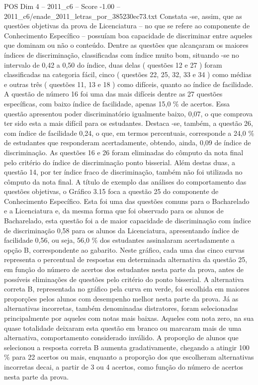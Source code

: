 \begin{textsample}{POS Dim 4 – 2011\_c6 – Score -1.00 – 2011\_c6/enade\_2011\_letras\_por\_385230ec73.txt}
Constata -se, assim, que as questões objetivas da prova de Licenciatura – no que se refere ao componente de Conhecimento Específico – possuíam boa capacidade de discriminar entre aqueles que dominam ou não o conteúdo.
Dentre as questões que alcançaram os maiores índices de discriminação, classificadas com índice muito bom, situando -se no intervalo de 0,42 a 0,50 do índice, duas delas ( questões 12 e 27 ) foram classificadas na categoria fácil, cinco ( questões 22, 25, 32, 33 e 34 ) como médias e outras três ( questões 11, 13 e 18 ) como difíceis, quanto ao índice de facilidade.
A questão de número 16 foi uma das mais difíceis dentre as 27 questões específicas, com baixo índice de facilidade, apenas 15,0 \% de acertos.
Essa questão apresentou poder discriminatório igualmente baixo, 0,07, o que comprova ter sido esta a mais difícil para os estudantes.
Destaca -se, também, a questão 26, com índice de facilidade 0,24, o que, em termos percentuais, corresponde a 24,0 \% de estudantes que responderam acertadamente, obtendo, ainda, 0,09 de índice de discriminação.
As questões 16 e 26 foram eliminadas do cômputo da nota final pelo critério do índice de discriminação ponto bisserial.
Além destas duas, a questão 14, por ter índice fraco de discriminação, também não foi utilizada no cômputo da nota final.
A título de exemplo das análises do comportamento das questões objetivas, o Gráfico 3.15 foca a questão 25 do componente de Conhecimento Específico.
Esta foi uma das questões comuns para o Bacharelado e a Licenciatura e, da mesma forma que foi observado para os alunos de Bacharelado, esta questão foi a de maior capacidade de discriminação com índice de discriminação 0,58 para os alunos da Licenciatura, apresentando índice de facilidade 0,56, ou seja, 56,0 \% dos estudantes assinalaram acertadamente a opção B, correspondente ao gabarito.
Neste gráfico, cada uma das cinco curvas representa o percentual de respostas em determinada alternativa da questão 25, em função do número de acertos dos estudantes nesta parte da prova, antes de possíveis eliminações de questões pelo critério do ponto bisserial.
A alternativa correta B, representada no gráfico pela curva em verde, foi escolhida em maiores proporções pelos alunos com desempenho melhor nesta parte da prova.
Já as alternativas incorretas, também denominadas distratores, foram selecionadas principalmente por aqueles com notas mais baixas.
Aqueles com nota zero, na sua quase totalidade deixaram esta questão em branco ou marcaram mais de uma alternativa, comportamento considerado inválido.
A proporção de alunos que selecionou a resposta correta B aumenta gradativamente, chegando a atingir 100 \% para 22 acertos ou mais, enquanto a proporção dos que escolheram alternativas incorretas decai, a partir de 3 ou 4 acertos, como função do número de acertos nesta parte da prova.

\end{textsample}
